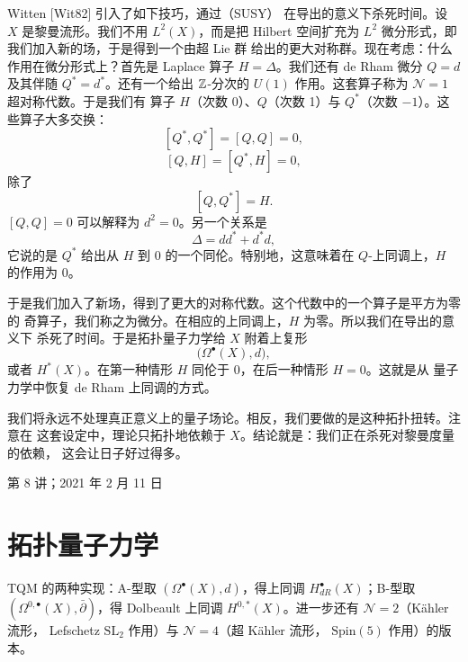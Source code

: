 Witten [Wit82] 引入了如下技巧，通过（SUSY）
在导出的意义下杀死时间。设 $X$ 是黎曼流形。我们不用 $L^{2}(X)$，而是把
Hilbert 空间扩充为 $L^{2}$ 微分形式，即我们加入新的场，于是得到一个由超 Lie 群
给出的更大对称群。现在考虑：什么作用在微分形式上？首先是 Laplace 算子
$H=\Delta$。我们还有 de Rham 微分 $Q=d$ 及其伴随 $Q^{*}=d^{*}$。还有一个给出
$\mathbb{Z}$-分次的 $U(1)$ 作用。这套算子称为 $\mathcal{N}=1$ 超对称代数。于是我们有
算子 $H$（次数 0）、$Q$（次数 1）与 $Q^{*}$（次数 $-1$）。这些算子大多交换：
\begin{equation}\tag{4.58}
[Q^{*},Q^{*}]=[Q,Q]=0,
\end{equation}
\begin{equation}\tag{4.59}
[Q,H]=[Q^{*},H]=0,
\end{equation}
除了
\begin{equation}\tag{4.60}
[Q,Q^{*}]=H.
\end{equation}
$[Q,Q]=0$ 可以解释为 $d^{2}=0$。另一个关系是
\begin{equation}\tag{4.61}
\Delta=dd^{*}+d^{*}d,
\end{equation}
它说的是 $Q^{*}$ 给出从 $H$ 到 $0$ 的一个同伦。特别地，这意味着在
$Q$-上同调上，$H$ 的作用为 0。

于是我们加入了新场，得到了更大的对称代数。这个代数中的一个算子是平方为零的
奇算子，我们称之为微分。在相应的上同调上，$H$ 为零。所以我们在导出的意义下
杀死了时间。于是拓扑量子力学给 $X$ 附着上复形
\begin{equation}\tag{4.62}
\bigl(\Omega^{\bullet}(X),d\bigr),
\end{equation}
或者 $H^{*}(X)$。在第一种情形 $H$ 同伦于 0，在后一种情形 $H=0$。这就是从
量子力学中恢复 de Rham 上同调的方式。


我们将永远不处理真正意义上的量子场论。相反，我们要做的是这种拓扑扭转。注意在
这套设定中，理论只拓扑地依赖于 $X$。结论就是：我们正在杀死对黎曼度量的依赖，
这会让日子好过得多。

\begin{flushright}\small 第 8 讲；2021 年 2 月 11 日\end{flushright}

\section{拓扑量子力学}
\begin{sectionkey}
TQM 的两种实现：A-型取 $(\Omega^{\bullet}(X),d)$，得上同调
$H^{\bullet}_{dR}(X)$；B-型取 $(\Omega^{0,\bullet}(X),\bar\partial)$，得
Dolbeault 上同调 $H^{0,*}(X)$。进一步还有 $\mathcal{N}=2$（Kähler 流形，
Lefschetz $\mathrm{SL}_{2}$ 作用）与 $\mathcal{N}=4$（超 Kähler 流形，
$\mathrm{Spin}(5)$ 作用）的版本。
\end{sectionkey}

